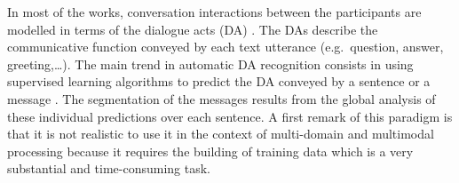 In most of the works, conversation interactions between the participants are modelled in terms of the dialogue acts (DA) \cite{austin:1970}. The DAs describe the communicative function conveyed by each text utterance  (e.g.~question, answer, greeting,\ldots).
%
The main trend in automatic DA recognition consists in using supervised learning algorithms to predict the DA conveyed by a sentence or a message \cite{joty:2013:sigdial}.
%
The segmentation of the messages results from the global analysis of these individual predictions over each sentence.
%
A first remark of this paradigm is that it is not realistic to use it in the context of multi-domain and multimodal processing because it requires the building of training data which is a very substantial and time-consuming task.

